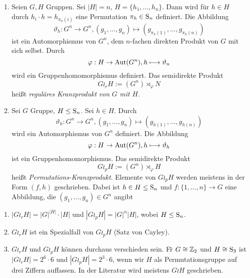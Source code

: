 \begin{definition}[Kranzprodukt] \spspace
\begin{enumerate}
 \item Seien $G,H$ Gruppen. Sei $|H|=n$, $H=\lbrace h_1,\ldots,h_n \rbrace$. Dann wird f\"ur $h\in H$ durch $h_i\cdot h= h_{\pi_h(i)}$ eine Permutation $\pi_h \in \operatorname{S}_n$ definiert. Die Abbildung
$$\vartheta_h:G^n\to G^n,(g_1,\ldots,g_n)\longmapsto (g_{\pi_h(1)},\ldots,g_{\pi_h(n)})$$
ist ein Automorphismus von $G^n$, dem $n$-fachen direkten Produkt von $G$ mit sich selbst. Durch $$\varphi: H\to \operatorname{Aut}(G^n), h\longmapsto \vartheta_n$$ wird ein Gruppenhomomorphismus definiert. Das semidirekte Produkt $$G \wr_r H := (G^n) \rtimes_\varphi N$$ hei\ss{}t \emph{regul\"ares Kranzprodukt von $G$ mit $H$}.
 \item Sei $G$ Gruppe, $H\leq \operatorname{S}_n$. Sei $h\in H$. Durch
$$\vartheta_h:G^n\to G^n, (g_1,\ldots,g_n)\longmapsto (g_{h(1)},\ldots,g_{h(n)})$$
wird ein Automorphismus von $G^n$ definiert. Die Abbildung
$$\varphi:H\to \operatorname{Aut}(G^n), h\longmapsto \vartheta_h$$
ist ein Gruppenhomomorphismus. Das semidirekte Produkt
$$G\wr_p H:=(G^n)\rtimes_\varphi H$$ hei\ss{}t \emph{Permutations-Kranzprodukt}.
Elemente von $G \wr_p H$ werden meistens in der Form $(f,h)$ geschrieben. Dabei ist $h\in H\leq \operatorname{S}_n$ und $f:\lbrace 1,\ldots,n\rbrace\to G$ eine Abbildung, die $(g_1,\ldots,g_n)\in G^n$ angibt
\end{enumerate}

\end{definition}

\begin{bemerkung*}
 \begin{enumerate}
  \item $|G\wr_r H| = |G|^{|H|}\cdot |H|$ und $|G\wr_p H|=|G|^n |H|$, wobei $H\leq \operatorname{S}_n$.
  \item $G\wr_r H$ ist ein Spezialfall von $G\wr_p H$ (Satz von Cayley).
  \item $G\wr_r H$ und $G\wr_p H$ k\"onnen durchaus verschieden sein. F\"r $G\cong \mathbb{Z}_2$ und $H\cong \operatorname{S}_3$ ist $|G\wr_r H|=2^6\cdot 6$ und $|G\wr_p H| = 2^3\cdot 6$, wenn wir $H$ als Permutationsgruppe auf drei Ziffern auffassen. In der Literatur wird meistens $G\wr H$ geschrieben.
 \end{enumerate}

\end{bemerkung*}


